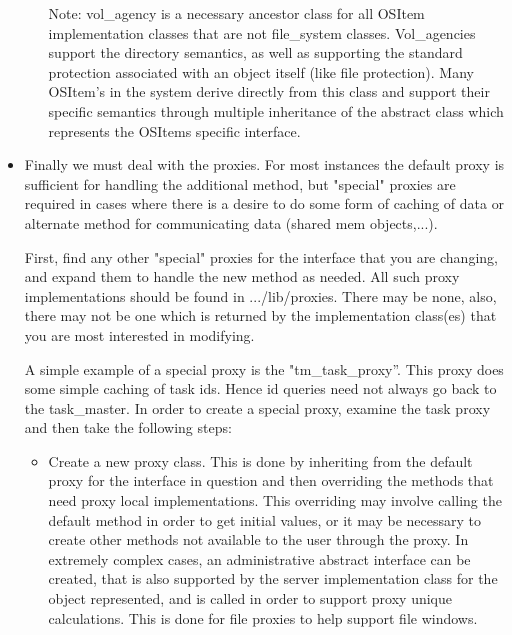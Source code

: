 \begin{itemize}
\begin{itemize}
Note: vol\_agency is a necessary ancestor class for all OSItem implementation
classes that are not file\_system classes.  Vol\_agencies support the
directory semantics, as well as supporting the standard protection associated
with an object itself (like file protection).  Many OSItem's in the system
derive directly from this class and support their specific semantics through
multiple inheritance of the abstract class which represents the OSItems
specific interface.
\end{itemize}

\item Finally we must deal with the proxies.
For most instances the default proxy is
sufficient for handling the additional method, but "special" proxies are
required in cases where there is
a desire to do some form of caching of data or alternate method for
communicating data (shared mem objects,...).

First,  find any other "special" proxies for the interface that you are 
changing, and expand them to handle the
new method as needed.  All such proxy implementations should be found in
.../lib/proxies.  There may be none, also, there may not be one which
is returned by the implementation class(es) that you are most interested
in modifying.

A simple example of a special proxy is the "tm\_task\_proxy''.  This
proxy does some simple caching of task ids.  Hence id
queries need not always go back to the task\_master.  In order to
create a special proxy,  examine the task
proxy and then take the following
steps:
\begin{itemize}
\item Create a new proxy class.  This is done by inheriting from the
default proxy for the interface in question and then overriding the
methods that need proxy local implementations.  This overriding may
involve calling the default method in order to get initial values, or
it may be necessary to create other methods not available to the
user through the proxy.  In extremely complex cases, an administrative
abstract interface can be created,
that is also supported by the server implementation class
for the object represented, and is called in order to support proxy unique
calculations.  This is done for file proxies to help support file windows.


\end{itemize}
\end{itemize}
